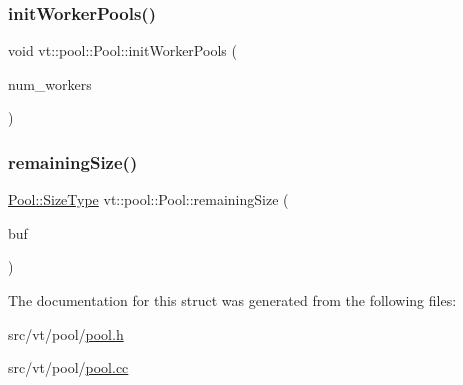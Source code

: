 \mbox{\label{structvt_1_1pool_1_1_pool_aeb8ad6a3ac3cf168dc4f2d2be2714edc}} 
\subsubsection{\texorpdfstring{init\+Worker\+Pools()}{initWorkerPools()}}
{\footnotesize\ttfamily void vt\+::pool\+::\+Pool\+::init\+Worker\+Pools (\begin{DoxyParamCaption}\item[{\hyperlink{namespacevt_aa93398ea48f2cb6c188512250f7cc248}{Worker\+Count\+Type} const \&}]{num\+\_\+workers }\end{DoxyParamCaption})}

\mbox{\label{structvt_1_1pool_1_1_pool_a7d6742d6abc615255e25363a1be067be}} 
\subsubsection{\texorpdfstring{remaining\+Size()}{remainingSize()}}
{\footnotesize\ttfamily \hyperlink{structvt_1_1pool_1_1_pool_a4030898e09d0160c24743a7b949c0d46}{Pool\+::\+Size\+Type} vt\+::pool\+::\+Pool\+::remaining\+Size (\begin{DoxyParamCaption}\item[{void $\ast$const}]{buf }\end{DoxyParamCaption})}



The documentation for this struct was generated from the following files\+:\begin{DoxyCompactItemize}
\item 
src/vt/pool/\hyperlink{pool_8h}{pool.\+h}\item 
src/vt/pool/\hyperlink{pool_8cc}{pool.\+cc}\end{DoxyCompactItemize}
